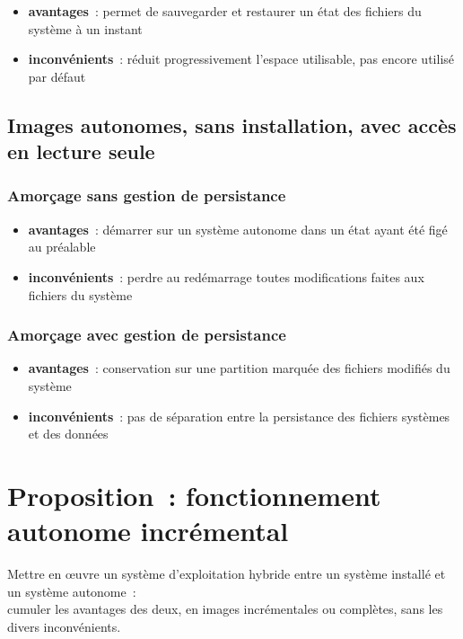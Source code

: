 \documentclass[10pt]{article}
\newenvironment{itmz}{\begin{itemize}
\setlength{\itemsep}{0em}
}{\end{itemize}}
\begin{document}
\begin{itmz}
\item{\textbf{avantages} : permet de sauvegarder et restaurer un état des fichiers du système à un instant}
\item{\textbf{inconvénients} : réduit progressivement l’espace utilisable, pas encore utilisé par défaut}
\end{itmz}

\subsection{Images autonomes, sans installation, avec accès en lecture seule}

\subsubsection{Amorçage sans gestion de persistance}

\begin{itmz}
\item{\textbf{avantages} : démarrer sur un système autonome dans un état ayant été figé au préalable}
\item{\textbf{inconvénients} : perdre au redémarrage toutes modifications faites aux fichiers du système}
\end{itmz}

\subsubsection{Amorçage avec gestion de persistance}

\begin{itmz}
\item{\textbf{avantages} : conservation sur une partition marquée des fichiers modifiés du système}
\item{\textbf{inconvénients} : pas de séparation entre la persistance des fichiers systèmes et des données}
\end{itmz}

\section{Proposition : fonctionnement autonome incrémental}

Mettre en œuvre un système d’exploitation hybride entre un système installé et un système autonome :\\
cumuler les avantages des deux, en images incrémentales ou complètes, sans les divers inconvénients.
\end{document}
